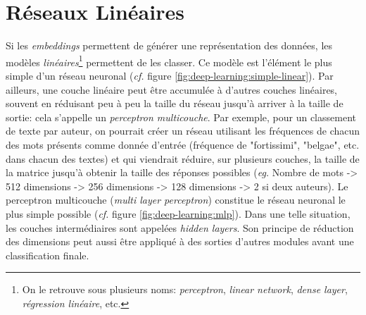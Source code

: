 \section{Réseaux Linéaires}
\label{deep-learning:linear}

Si les \textit{embeddings} permettent de générer une représentation des données, les modèles \textit{linéaires}\footnote{On le retrouve sous plusieurs noms: \textit{perceptron}, \textit{linear network}, \textit{dense layer}, \textit{régression linéaire}, etc.} permettent de les classer. Ce modèle est l'élément le plus simple d'un réseau neuronal (\textit{cf.} figure \ref{fig:deep-learning:simple-linear}). Par ailleurs, une couche linéaire peut être accumulée à d'autres couches linéaires, souvent en réduisant peu à peu la taille du réseau jusqu'à arriver à la taille de sortie: cela s'appelle un \textit{perceptron multicouche}. Par exemple, pour un classement de texte par auteur, on pourrait créer un réseau utilisant les fréquences de chacun des mots présents comme donnée d'entrée (fréquence de "fortissimi", "belgae", etc. dans chacun des textes) et qui viendrait réduire, sur plusieurs couches, la taille de la matrice jusqu'à obtenir la taille des réponses possibles (\textit{eg.} Nombre de mots -> 512 dimensions -> 256 dimensions -> 128 dimensions -> 2 si deux auteurs). Le perceptron multicouche (\textit{multi layer perceptron}) constitue le réseau neuronal le plus simple possible (\textit{cf.} figure \ref{fig:deep-learning:mlp}). Dans une telle situation, les couches intermédiaires sont appelées \textit{hidden layers}. Son principe de réduction des dimensions peut aussi être appliqué à des sorties d'autres modules avant une classification finale.

